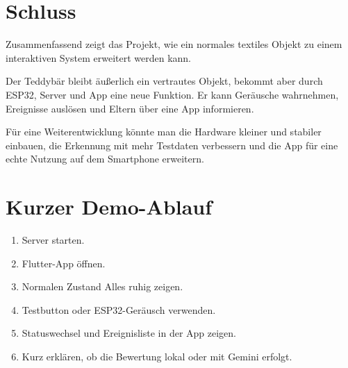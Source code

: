 \documentclass[11pt,a4paper]{article}
\begin{document}
\section*{Schluss}
Zusammenfassend zeigt das Projekt, wie ein normales textiles Objekt zu
einem interaktiven System erweitert werden kann.

Der Teddybär bleibt äußerlich ein vertrautes Objekt, bekommt aber durch
ESP32, Server und App eine neue Funktion. Er kann Geräusche wahrnehmen,
Ereignisse auslösen und Eltern über eine App informieren.

Für eine Weiterentwicklung könnte man die Hardware kleiner und stabiler
einbauen, die Erkennung mit mehr Testdaten verbessern und die App für
eine echte Nutzung auf dem Smartphone erweitern.

\section*{Kurzer Demo-Ablauf}
\begin{enumerate}[label=\arabic*.]
  \item Server starten.
  \item Flutter-App öffnen.
  \item Normalen Zustand \glqq Alles ruhig\grqq{} zeigen.
  \item Testbutton oder ESP32-Geräusch verwenden.
  \item Statuswechsel und Ereignisliste in der App zeigen.
  \item Kurz erklären, ob die Bewertung lokal oder mit Gemini erfolgt.
\end{enumerate}
\end{document}
